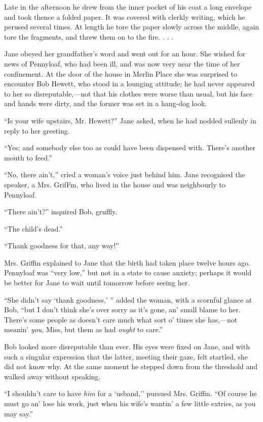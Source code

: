 Late in the afternoon he drew from the inner pocket of his coat a long
envelope and took thence a folded paper. It was covered with clerkly
writing, which he perused several times. At length he tore the paper
slowly across the middle, again tore the fragments, and threw them on to
the fire. . . .

Jane obeyed her grandfather's word and went out for an hour. She wished
for news of Pennyloaf, who had been ill, and was now very near the time
of her confinement. At the door of the house in Merlin Place she was
surprised to encounter Bob Hewett, who stood in a lounging attitude; he
had never appeared to her so disreputable,---not that his clothes were
worse than usual, but his face and hands were dirty, and the former was
set in a hang-dog look.

``Is your wife upstairs, Mr. Hewett?'' Jane asked, when he had nodded
sullenly in reply to her greeting.

{\protect\hypertarget{145}{}{}}``Yes; and somebody else too as could
have been dispensed with. There's another mouth to feed.''

``No, there ain't,'' cried a woman's voice just behind him. Jane
recognised the speaker, a Mrs. GrifFm, who lived in the house and was
neighbourly to Pennyloaf.

``There ain't?'' inquired Bob, gruffly.

``The child's dead.''

``Thank goodness for that, any way!''

Mrs. Griffin explained to Jane that the birth had taken place twelve
hours ago. Pennyloaf was ``very low,'' but not in a state to cause
anxiety; perhaps it would be better for Jane to wait until tomorrow
before seeing her.

``She didn't say `thank goodness,' '' added the woman, with a scornful
glance at Bob, ``but I don't think she's over sorry as it's gone, an'
small blame to her. There's some people as doesn't care much what sort
o' times she has,---not meanin' \emph{you}, Miss, but them as had
\emph{ought} to care.''

Bob looked more disreputable than ever. His eyes were fixed on Jane, and
with such a singular expression that the latter, meeting
{\protect\hypertarget{146}{}{}}their gaze, felt startled, she did not
know why. At the same moment he stepped down from the threshold and
walked away without speaking.

``I shouldn't care to have \emph{him} for a `usband,'' pursued Mrs.
Griffin. ``Of course he must go an' lose his work, just when his wife's
wantin' a few little extries, as you may say.''

